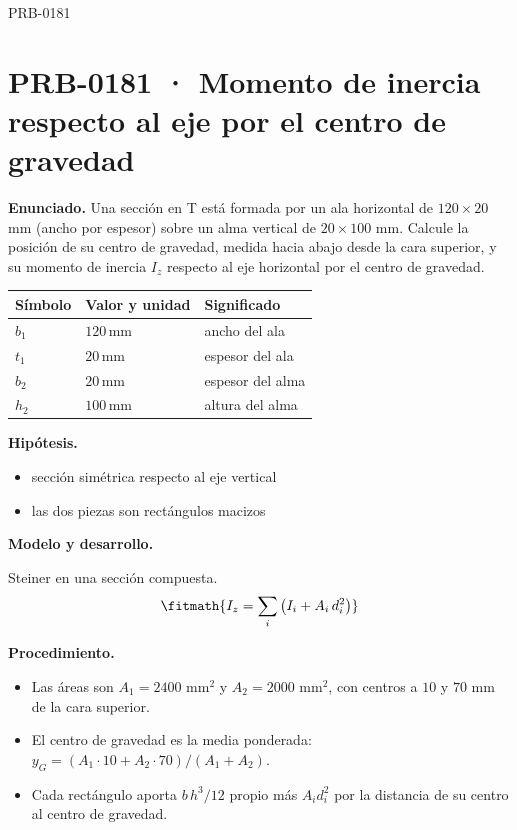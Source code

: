 \begin{studiumworked}{PRB-0181}

\section{PRB-0181 · Momento de inercia respecto al eje por el centro de gravedad}

\textbf{Enunciado.} Una sección en T está formada por un ala horizontal de $120\times 20$ mm (ancho por espesor) sobre un alma vertical de $20\times 100$ mm. Calcule la posición de su centro de gravedad, medida hacia abajo desde la cara superior, y su momento de inercia $I_z$ respecto al eje horizontal por el centro de gravedad.

\par\medskip\noindent\begin{tabular}{@{}p{.18\linewidth}p{.26\linewidth}p{.48\linewidth}@{}}
\toprule Símbolo & Valor y unidad & Significado\\\midrule
$b_{1}$ & $120\,\mathrm{mm}$ & ancho del ala\\
$t_{1}$ & $20\,\mathrm{mm}$ & espesor del ala\\
$b_{2}$ & $20\,\mathrm{mm}$ & espesor del alma\\
$h_{2}$ & $100\,\mathrm{mm}$ & altura del alma\\
\bottomrule\end{tabular}\par\medskip

\textbf{Hipótesis.}\begin{itemize}\item sección simétrica respecto al eje vertical
\item las dos piezas son rectángulos macizos\end{itemize}

\textbf{Modelo y desarrollo.}

Steiner en una sección compuesta.\[\fitmath{I_z = \sum_i \left(I_i + A_i\,d_i^{2}\right)}\]

\textbf{Procedimiento.}\begin{itemize}\item Las áreas son $A_1 = 2400$ mm$^2$ y $A_2 = 2000$ mm$^2$, con centros a $10$ y $70$ mm de la cara superior.
\item El centro de gravedad es la media ponderada: $y_G = (A_1 \cdot 10 + A_2 \cdot 70)/(A_1 + A_2)$.
\item Cada rectángulo aporta $b\,h^3/12$ propio más $A_i d_i^2$ por la distancia de su centro al centro de gravedad.\end{itemize}


\end{studiumworked}
